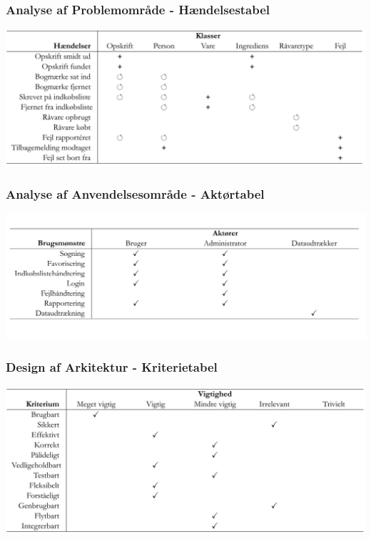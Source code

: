 	\begin{frame}
		\frametitle{Analyse af Problemområde - Hændelsestabel}
		\begin{center}
    		\includegraphics[scale=0.3]{billeder/haendelsestabel.png}
		\end{center}
	\end{frame}
	
	\begin{frame}
		\frametitle{Analyse af Anvendelsesområde - Aktørtabel}
		\begin{center}
    		\includegraphics[scale=0.35]{billeder/aktoertabel.png}
		\end{center}
	\end{frame}
	
	\begin{frame}
		\frametitle{Design af Arkitektur - Kriterietabel}
		\begin{center}
    		\includegraphics[scale=0.3]{billeder/kriterietabel.png}
		\end{center}
	\end{frame}
	
